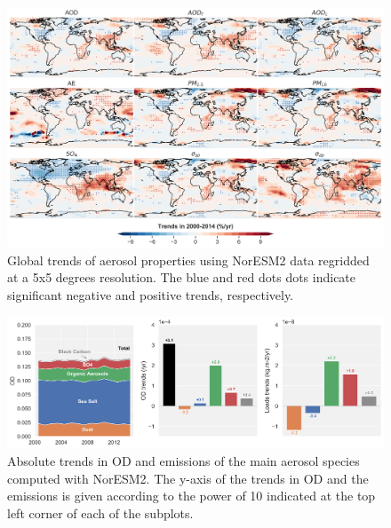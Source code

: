 \documentclass[acp, manuscript]{copernicus}
\begin{document}
\clearpage
\begin{figure}[t]
 \includegraphics[width=16cm]{Figures/Figure7.png}
 \caption{Global trends of aerosol properties using NorESM2 data regridded at a 5x5 degrees resolution. The blue and red dots dots indicate significant negative and positive trends, respectively.}
 \label{fig:global_trends}
\end{figure}

\clearpage
\begin{figure}[t]
 \includegraphics[width=16cm]{Figures/Figure8.png}
 \caption{Absolute trends in OD and emissions of the main aerosol species computed with NorESM2. The y-axis of the trends in OD and the emissions is given according to the power of 10 indicated at the top left corner of each of the subplots.}
 \label{fig:species}
\end{figure}







\end{document}
